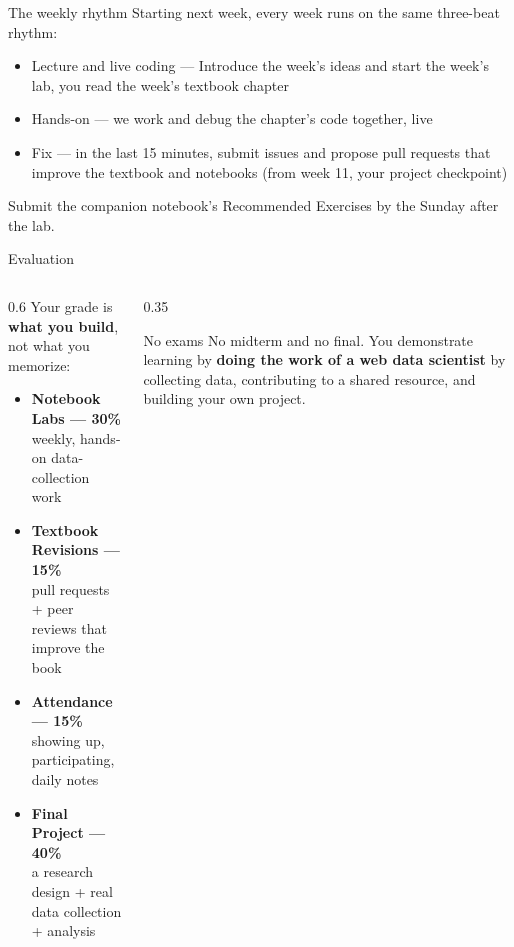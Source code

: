 \documentclass[9pt,aspectratio=169]{beamer}
\begin{document}
\begin{frame}{The weekly rhythm}
    Starting next week, every week runs on the same three-beat rhythm:

    \bigskip

    \begin{itemize}\small
        \item Lecture and live coding --- Introduce the week's ideas and start the week's lab, you read the week's textbook chapter
    \end{itemize}
    \medskip
    \begin{itemize}\small
        \item Hands-on --- we work and debug the chapter's code together, live
    \end{itemize}
    \medskip
    \begin{itemize}\small
        \item Fix --- in the last 15 minutes, submit issues and propose pull requests that improve the textbook and notebooks (from week 11, your project checkpoint)
    \end{itemize}
    \medskip
    Submit the companion notebook's Recommended Exercises by the Sunday after the lab.
\end{frame}

\begin{frame}{Evaluation}
    \begin{columns}[T]
        \begin{column}{0.6\textwidth}
            Your grade is \textbf{what you build}, not what you memorize:
            \medskip
            \begin{itemize}
                \item \textbf{Notebook Labs --- 30\%}\\ {\small weekly, hands-on data-collection work}
                \item \textbf{Textbook Revisions --- 15\%}\\ {\small pull requests + peer reviews that improve the book}
                \item \textbf{Attendance --- 15\%}\\ {\small showing up, participating, daily notes}
                \item \textbf{Final Project --- 40\%}\\ {\small a research design + real data collection + analysis}
            \end{itemize}
        \end{column}
        \begin{column}{0.35\textwidth}
            \begin{block}{No exams}
                \footnotesize No midterm and no final. You demonstrate learning by \textbf{doing the work of a web data scientist} by collecting data, contributing to a shared resource, and building your own project.
            \end{block}
        \end{column}
    \end{columns}
\end{frame}
\end{document}

